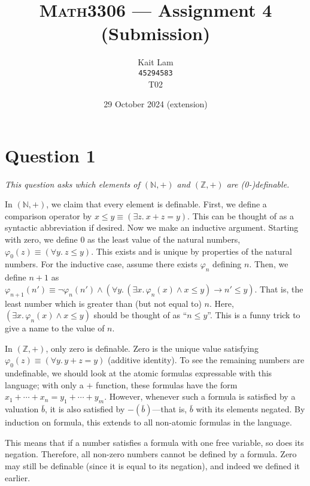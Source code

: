 \documentclass[a4paper]{article}
\author{Kait Lam \\ \small \texttt{45294583} \\ \small {T02}}
\title{\textsc{Math3306} --- Assignment 4 (Submission)}
\date{29 October 2024 (extension)}
\begin{document}
\maketitle


\section*{Question 1}
\begin{center}
  \textit{This question asks which elements of $(\mathbb N, +)$ and $(\mathbb Z, +)$ are (0-)definable.}
\end{center}
In $(\mathbb N, +)$, we claim that every element is definable.
First, we define a comparison operator by
$x \le y \equiv (\exists z.~ x + z = y)$.
This can be thought of as a syntactic abbreviation if desired.
Now we make an inductive argument.
Starting with zero, we define 0 as the 
least value of the natural numbers,
$\varphi_0(z) \equiv (\forall y.~ z \le y)$.
This exists and is unique by properties of the natural numbers.
For the inductive case, assume 
there exists $\varphi_n$ defining $n$.
Then, we define $n+1$
as $\varphi_{n+1}(n') \equiv \neg \varphi_n(n')  \wedge (\forall y.\,(\exists x. \,\varphi_n(x)\wedge x \le y) \longrightarrow n' \le y)$.
That is, the least number which is greater than (but not equal to) $n$.
Here, 
$(\exists x. \,\varphi_n(x)\wedge x \le y)$
should be thought of as ``$n \le y$''.
This is a funny trick to give a name to the
value of $n$.

In $(\mathbb Z, +)$, only zero is definable.
Zero is the unique value satisfying 
$\varphi_0(z) \equiv (\forall y. \,y + z = y)$ (additive identity).
To see the remaining numbers are undefinable, we should look at the atomic
formulas expressable with this language;
with only a $+$ function, these formulas have the form
$x_1 + \cdots + x_n = y_1 + \cdots + y_m$.
However, whenever such a formula is satisfied by a valuation $\bar b$,
it is also satisfied by $-(\bar b)$---that is, $\bar b$
with its elements negated.
By induction on formula, this extends to all non-atomic formulas in the language.

This means that if a number satisfies a formula with one free variable,
so does its negation.
Therefore, all non-zero numbers cannot be defined by a formula.
Zero may still be definable (since it is equal to its negation),
and indeed we defined it earlier.
\end{document}
